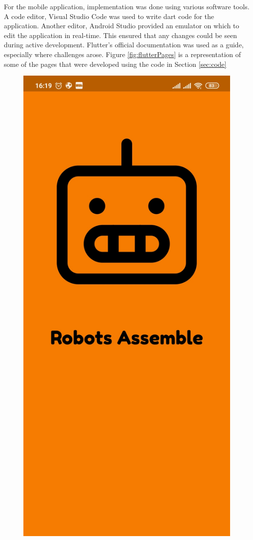 For the mobile application, implementation was done using various software tools. A code editor, Visual Studio Code was used to write dart code for the application. Another editor, Android Studio provided an emulator on which to edit the application in real-time. This ensured that any changes could be seen during active development. Flutter's official documentation was used as a guide, especially where challenges arose. Figure \ref{fig:flutterPages} is a representation of some of the pages that were developed using the code in Section \ref{sec:code}

\begin{figure}[H]
    \centering
    \includegraphics[scale = 0.2]{Figures/flutterOne.jpg}

\end{figure}
